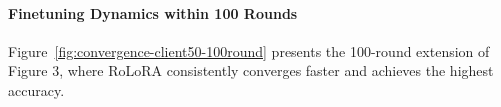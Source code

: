\documentclass{article}
\theoremstyle{plain}
\theoremstyle{definition}
\theoremstyle{remark}
\begin{document}

\paragraph{Finetuning Dynamics within 100 Rounds}
Figure~\ref{fig:convergence-client50-100round} presents the 100-round extension of Figure 3, where RoLoRA consistently converges faster and achieves the highest accuracy.
\end{document}
